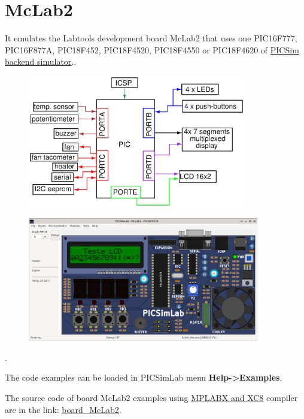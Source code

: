 \section{McLab2}

It emulates the Labtools development board McLab2 that uses one PIC16F777, PIC16F877A, PIC18F452, PIC18F4520, 
PIC18F4550 or PIC18F4620 of \hyperlink{def:PICSim}{PICSim backend simulator}..

\begin{figure}[H]
\center
\includegraphics[width=0.85\textwidth]{img/blocks_p3.eps} 
\end{figure} 


\begin{figure}[H]
\center
\includegraphics[width=0.9\textwidth]{img/picsimlab3.png} 
\end{figure} 

.\vspace{0.5cm}

The code examples can be loaded in PICSimLab menu \textbf{Help->Examples}.

The source code of board McLab2 examples using \href{http://www.microchip.com/mplabx}{MPLABX and XC8} 
compiler are in the link: \href{https://lcgamboa.github.io/picsimlab_examples/board_McLab2.html}{board\_McLab2}.

